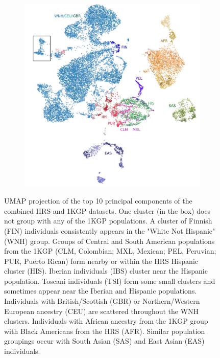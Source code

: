 \documentclass[12pt]{pnas-new}
\begin{document}
\begin{figure}
    \centering
    \begin{subfigure}{\textwidth}
    \includegraphics[width=\textwidth]{images/HRS_1000G_UMAP_PC10_NC2_NN15_MD05_2018627203416_label.pdf}
    \end{subfigure}
    \caption{UMAP projection of the top 10 principal components of the combined HRS and 1KGP datasets. One cluster (in the box) does not group with any of the 1KGP populations. A cluster of Finnish (FIN) individuals consistently appears in the "White Not Hispanic" (WNH) group. Groups of Central and South American populations from the 1KGP (CLM, Colombian; MXL, Mexican; PEL, Peruvian; PUR, Puerto Rican) form nearby or within the HRS Hispanic cluster (HIS). Iberian individuals (IBS) cluster near the Hispanic population. Toscani individuals (TSI) form some small clusters and sometimes appear near the Iberian and Hispanic populations. Individuals with British/Scottish (GBR) or Northern/Western European ancestry (CEU) are scattered throughout the WNH clusters. Individuals with African ancestry from the 1KGP group with Black Americans from the HRS (AFR). Similar population groupings occur with South Asian (SAS) and East Asian (EAS) individuals.}
    \label{fig:supp_hrs_1000g}
\end{figure}
\end{document}
